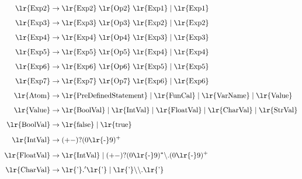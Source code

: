 \documentclass[a4paper,12pt]{article}
\begin{document}
\begin{align*}
\text{\lr{Exp2}} &\rightarrow \text{\lr{Exp2}} \; \text{\lr{Op2}} \; \text{\lr{Exp1}} \mid \text{\lr{Exp1}} \\[0.5em]
\text{\lr{Exp3}} &\rightarrow \text{\lr{Exp3}} \; \text{\lr{Op3}} \; \text{\lr{Exp2}} \mid \text{\lr{Exp2}} \\[0.5em]
\text{\lr{Exp4}} &\rightarrow \text{\lr{Exp4}} \; \text{\lr{Op4}} \; \text{\lr{Exp3}} \mid \text{\lr{Exp3}} \\[0.5em]
\text{\lr{Exp5}} &\rightarrow \text{\lr{Exp5}} \; \text{\lr{Op5}} \; \text{\lr{Exp4}} \mid \text{\lr{Exp4}} \\[0.5em]
\text{\lr{Exp6}} &\rightarrow \text{\lr{Exp6}} \; \text{\lr{Op6}} \; \text{\lr{Exp5}} \mid \text{\lr{Exp5}} \\[0.5em]
\text{\lr{Exp7}} &\rightarrow \text{\lr{Exp7}} \; \text{\lr{Op7}} \; \text{\lr{Exp6}} \mid \text{\lr{Exp6}} \\[0.5em]
\text{\lr{Atom}} &\rightarrow \text{\lr{PreDefinedStatement}} \mid \text{\lr{FunCal}} \mid \text{\lr{VarName}} \mid \text{\lr{Value}} \\[0.5em]
\text{\lr{Value}} &\rightarrow \text{\lr{BoolVal}} \mid \text{\lr{IntVal}} \mid \text{\lr{FloatVal}} \mid \text{\lr{CharVal}} \mid \text{\lr{StrVal}} \\[0.5em]
\text{\lr{BoolVal}} &\rightarrow \text{\lr{false}} \mid \text{\lr{true}} \\[0.5em]
\text{\lr{IntVal}} &\rightarrow (+-)?(0\text{\lr{-}}9)^+ \\[0.5em]
\text{\lr{FloatVal}} &\rightarrow \text{\lr{IntVal}} \mid (+-)?(0\text{\lr{-}}9)^*\backslash.(0\text{\lr{-}}9)^+ \\[0.5em]
\text{\lr{CharVal}} &\rightarrow \text{\lr{'}}.'\text{\lr{'}} \mid \text{\lr{'}}\backslash\backslash.\text{\lr{'}} \\[0.5em]
\end{align*}
\end{document}
